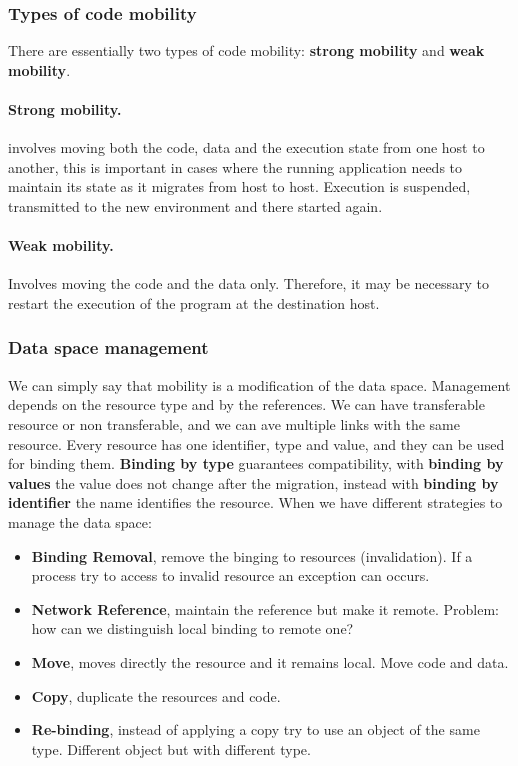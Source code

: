 \subsubsection{Types of code mobility}
There are essentially two types of code mobility: \textbf{strong mobility} and \textbf{weak mobility}. 

\paragraph*{Strong mobility.} involves moving both the code, data and the execution state from one host to another, this is important in cases where the running application needs to maintain its state as it migrates from host to host. Execution is suspended, transmitted to the new environment and there started again.

\paragraph*{Weak mobility.} Involves moving the code and the data only. Therefore, it may be necessary to restart the execution of the program at the destination host.

\subsubsection{Data space management} 
We can simply say that mobility is a modification of the data space. Management depends on the resource type and by the references. We can have transferable resource or non transferable, and we can ave multiple links with the same resource. Every resource has one identifier, type and value, and they can be used for binding them. \textbf{Binding by type} guarantees compatibility, with \textbf{binding by values} the value does not change after the migration, instead with \textbf{binding by identifier} the name identifies the resource.
When we have different strategies to manage the data space:
\begin{itemize}
	\item \textbf{Binding Removal}, remove the binging to resources (invalidation). If a process try to access to invalid resource an exception can occurs.
	\item \textbf{Network Reference}, maintain the reference but make it remote. Problem: how can we distinguish local binding to remote one?
	\item \textbf{Move}, moves directly the resource and it remains local. Move code and data.
	\item \textbf{Copy}, duplicate the resources and code.
	\item \textbf{Re-binding}, instead of applying a copy try to use an object of the same type. Different object but with different type.
\end{itemize}

